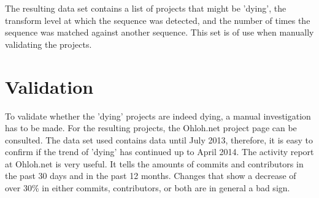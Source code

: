The resulting data set contains a list of projects that might be 'dying', the
transform level at which the sequence was detected, and the number of times the
sequence was matched against another sequence. This set is of use when manually
validating the projects.

\section{Validation}
To validate whether the 'dying' projects are indeed dying, a manual
investigation has to be made. For the resulting projects, the Ohloh.net project
page can be consulted. The data set used contains data until July 2013,
therefore, it is easy to confirm if the trend of 'dying' has continued up to
April 2014. The activity report at Ohloh.net is very useful. It tells the
amounts of commits and contributors in the past 30 days and in the past 12
months. Changes that show a decrease of over 30\% in either commits,
contributors, or both are in general a bad sign.

\begin{comment}
This section describes the methods used to answer the research questions. A
good structure of this section often follows the sub questions by providing a
method for each.

The research method can be based on the “Scientific method”, but more creative
solutions could be defined as well. In any case, the method needs a thorough
motivation grounded in theory in order to be acceptable.

As part of the method a number of hypotheses are described. These hypotheses
will be tested by the research, using the methods described here.

An important part of this section is validation. How will you evaluate and
validate the outcomes of the research? You can look at Paul Klint’s homepage
for examples of this section as
well\footnote{http://homepages.cwi.nl/~paulk/thesesMasterSoftwareEngineering/2006/RichardKettelerij.pdf}.
\end{comment}